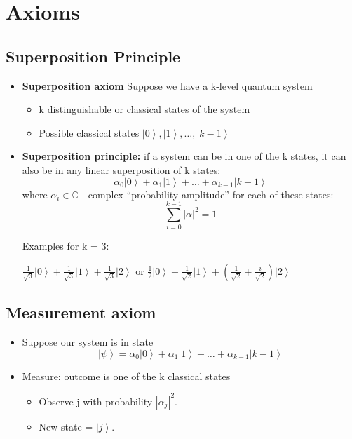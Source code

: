 \documentclass{scrartcl}
\newcommand{\cplx}{\mathbb{C}} %
\newcommand{\ket}[1]{\left| #1 \right>} %
\begin{document}
\section{Axioms}
\label{sec:2, week 1}

\subsection {Superposition Principle}
\label{sec:2-1}

\begin{itemize}
\item{\bf Superposition axiom} Suppose we have a k-level quantum system
  \begin{itemize}
  \item k distinguishable or classical states of the system
  \item Possible classical states $\ket{0},\ket{1}, \dots , \ket{k-1}$
  \end{itemize}
\item {\bf Superposition principle:} if a system can be in one of the k states,
  it can also be in any linear superposition of k states: \[\alpha_0 \ket{0} +
  \alpha_1 \ket{1} + \dots + \alpha_{k-1} \ket{k-1} \] where $\alpha_i \in
  \cplx$ - complex ``probability amplitude'' for each of these states: \[\sum
  \limits_{i=0}^{k-1} |\alpha|^2=1\]

  Examples for k = 3:

  $\frac 1{\sqrt{3}} \ket0 + \frac1{\sqrt{3}} \ket1 + \frac1{\sqrt{3}}\ket2$ or
  $\frac1{2}\ket0 - \frac1 {\sqrt{2}}\ket1 + (\frac1{\sqrt{2}} +
  \frac{i}{\sqrt{2}}) \ket2$
\end{itemize}

\subsection{Measurement axiom}
\begin{itemize}
\item Suppose our system is in state $$\ket\psi = \alpha_0\ket0 + \alpha_1\ket1
  + \ldots + \alpha_{k-1} \ket{k-1} $$
\item Measure: outcome is one of the k classical states
  \begin{itemize}
  \item Observe j with probability $|\alpha_j|^2$.
  \item New state = $\ket j$.
  \end{itemize}
\end{itemize}
\end{document}
